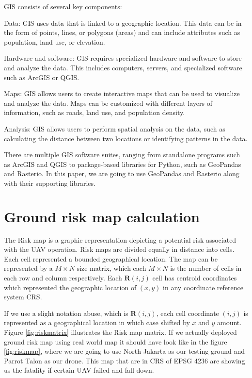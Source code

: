\documentclass[12pt]{report}
\begin{document}
            GIS consists of several key components:
            \begin{myitemize}
                \item Data: GIS uses data that is linked to a geographic location. This data can be in the form of
                points, lines, or polygons (areas) and can include attributes such as population, land use, or
                elevation.
                \item Hardware and software: GIS requires specialized hardware and software to store and analyze the
                data. This includes computers, servers, and specialized software such as ArcGIS or QGIS.
                \item Maps: GIS allows users to create interactive maps that can be used to visualize and analyze the
                data. Maps can be customized with different layers of information, such as roads, land use, and
                population density.
                \item Analysis: GIS allows users to perform spatial analysis on the data, such as calculating the
                distance between two locations or identifying patterns in the data.
            \end{myitemize}
            
            There are multiple GIS software suites, ranging from standalone programs such as ArcGIS and QGIS to
            package-based libraries for Python, such as GeoPandas and Rasterio. In this paper, we are going to use
            GeoPandas and Rasterio along with their supporting libraries.

    \section{Ground risk map calculation}
        The Risk map is a graphic representation depicting a potential risk associated with the UAV operation. Risk maps
        are divided equally in distance into cells. Each cell represented a bounded geographical location. The map can
        be represented by a \(M \times N\) size matrix, which each \(M \times N\) is the number of cells in each row and
        column respectively. Each \(\mathbf{R}(i,j)\) cell has centroid coordinates which represented the geographic
        location of \((x, y)\) in any coordinate reference system \ac{CRS}.

        If we use a slight notation abuse, which is \(\mathbf{R}(i,j)\), each cell coordinate \((i, j)\) is represented
        as a geographical location in which case shifted by \(x\) and \(y\) amount. Figure \ref{fig:riskmatrix}
        illustrates the Risk map matrix. If we actually deployed ground risk map using real world map it should have
        look like in the figure \ref{fig:riskmap}, where we are going to use North Jakarta as our testing ground and
        Parrot Talon as our drone. This map that are in \ac{CRS} of \ac{EPSG} 4236 are showing us the fatality if
        certain UAV failed and fall down.
\end{document}
